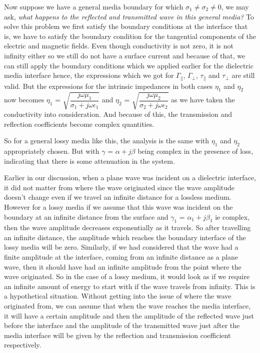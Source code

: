 Now suppose we have a general media boundary for which $\sigma_1 \neq \sigma_2 \neq 0$, we may ask, \emph{what happens to the reflected and transmitted wave in this general media?} To solve this problem we first satisfy the boundary conditions at the interface that is, we have to satisfy the boundary condition for the tangential components of the electric and magnetic fields. Even though conductivity is not zero, it is not infinity either so we still do not have a surface current and because of that, we can still apply the boundary conditions which we applied earlier for the dielectric media interface hence, the expressions which we got for $\Gamma_\parallel$, $\Gamma_\perp$, $\tau_\parallel$ and $\tau_\perp$ are still valid.  But the expressions for the intrinsic impedances in both cases $\eta_1$ and $\eta_2$ now becomes $\eta_1$ = $\sqrt{\dfrac{j\omega\mu_1}{\sigma_1 + j\omega\epsilon_1}}$ and $\eta_2$ = $\sqrt{\dfrac{j\omega\mu_2}{\sigma_2 + j\omega\epsilon_2}}$ as we have taken the conductivity into consideration. And because of this, the transmission and reflection coefficients become complex quantities.

So for a general lossy media like this, the analysis is the same with $\eta_1$ and $\eta_2$ appropriately chosen. But with $\gamma$ = $\alpha + j\beta$ being complex in the presence of loss, indicating that there is some attenuation in the system. 

Earlier in our discussion, when a plane wave was incident on a dielectric interface, it did not matter from where the wave originated since the wave amplitude doesn't change even if we travel an infinite distance for a lossless medium. However for a lossy media if we assume that this wave was incident on the boundary at an infinite distance from the surface and $\gamma_1$ = $\alpha_1 + j\beta_1$ ie complex, then the wave amplitude decreases exponentially as it travels. So after travelling an infinite distance, the amplitude which reaches the boundary interface of the lossy media will be zero. Similarly, if we had considered that the wave had a finite amplitude at the interface, coming from an infinite distance as a plane wave, then it should have had an infinite amplitude from the point where the wave originated. So in the case of a lossy medium, it would look as if we require an infinite amount of energy to start with if the wave travels from infinity. This is a hypothetical situation. Without getting into the issue of where the wave originated from, we can assume that when the wave reaches the media interface, it will have a certain amplitude and then the amplitude of the reflected wave just before the interface and the amplitude of the transmitted wave just after the media interface will be given by the reflection and transmission coefficient respectively. 

